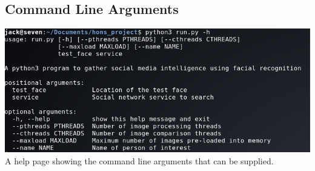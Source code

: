 \documentclass[12pt]{article}
\begin{document}
\begin{appendices}
\section{Command Line Arguments}
\label{appendix:commandlineargs}
\includegraphics[width=\linewidth]{res/facegather_cmd_line_args.png}
A help page showing the command line arguments that can be supplied.

\end{appendices}
\end{document}
